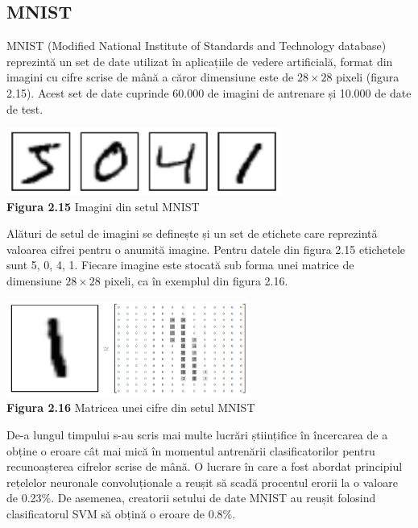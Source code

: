 \documentclass[a4paper,12pt]{report}
\newcommand\tab[1][1cm]{\hspace*{#1}}
\begin{document}
\subsection{MNIST}
\tab MNIST (Modified National Institute of Standards and Technology database) \cite{mnist1} reprezintă un set de date utilizat în aplicațiile de vedere artificială, format din imagini cu cifre scrise de mână a căror dimensiune este de $28\times28$ pixeli (figura 2.15). 
Acest set de date cuprinde 60.000 de imagini de antrenare și 10.000 de date de test. 
\begin {center} 
	\begin {footnotesize} 
		\includegraphics[width = 90mm]{fig2_15} \\
		\textbf  {Figura 2.15} Imagini din setul MNIST
	\end {footnotesize} 
\end {center}
\tab Alături de setul de imagini se definește și un set de etichete care reprezintă valoarea cifrei pentru o anumită imagine. Pentru datele din figura 2.15 etichetele sunt 5, 0, 4, 1. Fiecare imagine este stocată sub forma unei matrice de dimensiune $28\times28$ pixeli, ca în exemplul din figura 2.16.
\begin {center} 
	\begin {footnotesize} 
		\includegraphics[width = 80mm]{fig2_16} \\
		\textbf  {Figura 2.16} Matricea unei cifre din setul MNIST
	\end {footnotesize} 
\end {center}
\tab De-a lungul timpului s-au scris mai multe lucrări științifice în încercarea de a obține o eroare cât mai mică în momentul antrenării clasificatorilor pentru recunoașterea cifrelor scrise de mână. O lucrare în care a fost abordat principiul rețelelor neuronale convoluționale a reușit să scadă procentul erorii la o valoare de 0.23\%. De asemenea, creatorii setului de date MNIST au reușit folosind clasificatorul SVM să obțină o eroare de 0.8\%.  
\end{document}

